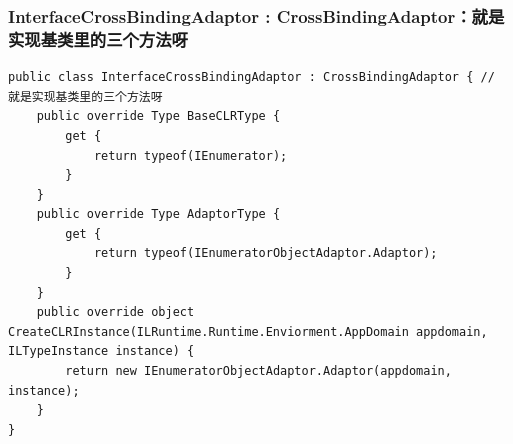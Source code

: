 \documentclass[9pt, b5paper]{article}
\begin{document}
\subsubsection{InterfaceCrossBindingAdaptor : CrossBindingAdaptor：就是实现基类里的三个方法呀}
\label{sec-5-1-3}
\begin{verbatim}
public class InterfaceCrossBindingAdaptor : CrossBindingAdaptor { // 就是实现基类里的三个方法呀
    public override Type BaseCLRType {
        get {
            return typeof(IEnumerator);
        }
    }
    public override Type AdaptorType {
        get {
            return typeof(IEnumeratorObjectAdaptor.Adaptor);
        }
    }
    public override object CreateCLRInstance(ILRuntime.Runtime.Enviorment.AppDomain appdomain, ILTypeInstance instance) {
        return new IEnumeratorObjectAdaptor.Adaptor(appdomain, instance);
    }
}
\end{verbatim}
\end{document}
